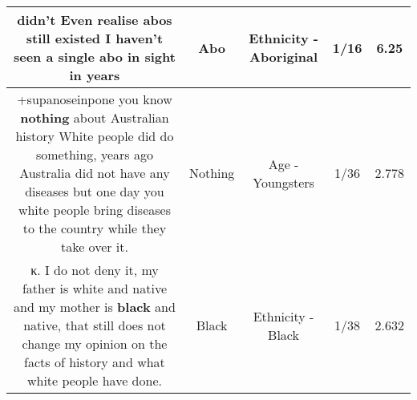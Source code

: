 \documentclass[11pt]{article}
\newlength\mylength
\begin{document}
\begin{center}
\begin{longtable}{|C{.65\mylength}|C{.30\mylength}|C{.12\mylength}|C{.12\mylength}|C{.12\mylength}|}
  \small didn't Even realise abos still existed I haven't seen a single \textbf{abo} in sight in years\normalsize   & Abo & Ethnicity - Aboriginal & 1/16 & 6.25 \\  \hline
  \small +supanoseinpone you know \textbf{nothing} about Australian history White people did do something, years ago Australia did not have any diseases but one day you white people bring diseases to the country while they take over it.\normalsize   & Nothing & Age - Youngsters & 1/36 & 2.778 \\  \hline
  \small {} κ. I do not deny it, my father is white and native and my mother is \textbf{black} and native, that still does not change my opinion on the facts of history and what white people have done.\normalsize   & Black & Ethnicity - Black & 1/38 & 2.632 \\  \hline

\end{longtable}
\end{center}
\end{document}
